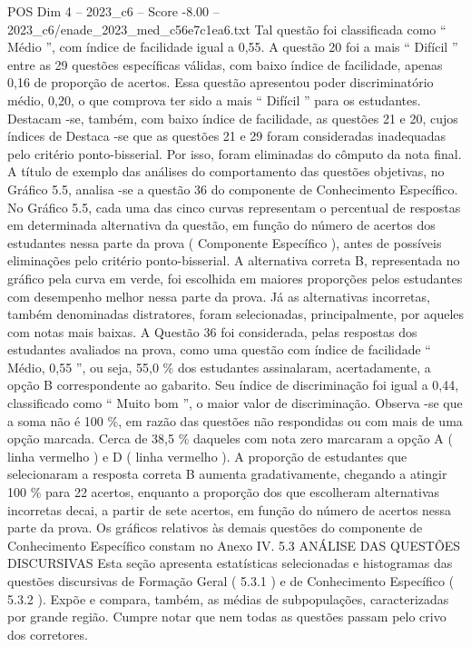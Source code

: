 \begin{textsample}{POS Dim 4 – 2023\_c6 – Score -8.00 – 2023\_c6/enade\_2023\_med\_c56e7c1ea6.txt}
Tal questão foi classificada como “ Médio ”, com índice de facilidade igual a 0,55.
A questão 20 foi a mais “ Difícil ” entre as 29 questões específicas válidas, com baixo índice de facilidade, apenas 0,16 de proporção de acertos.
Essa questão apresentou poder discriminatório médio, 0,20, o que comprova ter sido a mais “ Difícil ” para os estudantes.
Destacam -se, também, com baixo índice de facilidade, as questões 21 e 20, cujos índices de Destaca -se que as questões 21 e 29 foram consideradas inadequadas pelo critério ponto-bisserial.
Por isso, foram eliminadas do cômputo da nota final.
A título de exemplo das análises do comportamento das questões objetivas, no Gráfico 5.5, analisa -se a questão 36 do componente de Conhecimento Específico.
No Gráfico 5.5, cada uma das cinco curvas representam o percentual de respostas em determinada alternativa da questão, em função do número de acertos dos estudantes nessa parte da prova ( Componente Específico ), antes de possíveis eliminações pelo critério ponto-bisserial.
A alternativa correta B, representada no gráfico pela curva em verde, foi escolhida em maiores proporções pelos estudantes com desempenho melhor nessa parte da prova.
Já as alternativas incorretas, também denominadas distratores, foram selecionadas, principalmente, por aqueles com notas mais baixas.
A Questão 36 foi considerada, pelas respostas dos estudantes avaliados na prova, como uma questão com índice de facilidade “ Médio, 0,55 ”, ou seja, 55,0 \% dos estudantes assinalaram, acertadamente, a opção B correspondente ao gabarito.
Seu índice de discriminação foi igual a 0,44, classificado como “ Muito bom ”, o maior valor de discriminação.
Observa -se que a soma não é 100 \%, em razão das questões não respondidas ou com mais de uma opção marcada.
Cerca de 38,5 \% daqueles com nota zero marcaram a opção A ( linha vermelho ) e D ( linha vermelho ).
A proporção de estudantes que selecionaram a resposta correta B aumenta gradativamente, chegando a atingir 100 \% para 22 acertos, enquanto a proporção dos que escolheram alternativas incorretas decai, a partir de sete acertos, em função do número de acertos nessa parte da prova.
Os gráficos relativos às demais questões do componente de Conhecimento Específico constam no Anexo IV. 5.3 ANÁLISE DAS QUESTÕES DISCURSIVAS Esta seção apresenta estatísticas selecionadas e histogramas das questões discursivas de Formação Geral ( 5.3.1 ) e de Conhecimento Específico ( 5.3.2 ).
Expõe e compara, também, as médias de subpopulações, caracterizadas por grande região.
Cumpre notar que nem todas as questões passam pelo crivo dos corretores.

\end{textsample}
